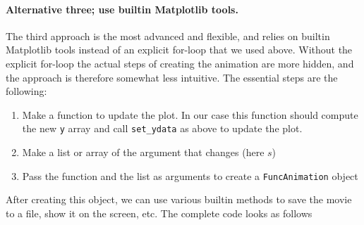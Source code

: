 \documentclass[graybox,envcountchap,sectrefs,final]{svmonodo}
\begin{document}
\paragraph{Alternative three; use builtin Matplotlib tools.}
The third approach is the most advanced and flexible, and relies on
builtin Matplotlib tools instead of an explicit for-loop that we used above. Without the explicit for-loop
the actual steps of creating the animation are more hidden, and the approach is therefore somewhat less
intuitive. The essential steps are the following:
\begin{enumerate}
\item Make a function to update the plot. In our case this function should compute the new \texttt{y} array and call
   \Verb!set_ydata! as above to update the plot.

\item Make a list or array of the argument that changes (here $s$)

\item Pass the function and the list as arguments to create a \texttt{FuncAnimation} object
\end{enumerate}

\noindent
After creating this object, we can use various builtin methods to save the movie to a file, show it
on the screen, etc. The complete code looks as follows
\end{document}
